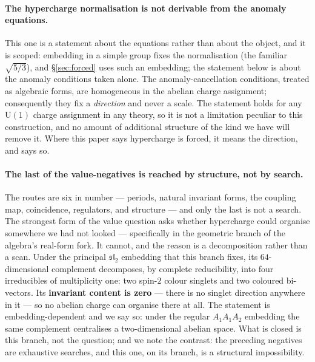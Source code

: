 \documentclass[11pt,a4paper]{article}
\theoremstyle{definition}
\theoremstyle{remark}
\begin{document}
\paragraph{The hypercharge normalisation is not derivable from the anomaly equations.} This one is a statement about
the equations rather than about the object, and it is scoped: embedding in a simple group fixes the normalisation (the
familiar $\sqrt{5/3}$), and \S\ref{sec:forced} uses such an embedding; the statement below is about the anomaly
conditions taken alone. The anomaly-cancellation conditions, treated as algebraic
forms, are homogeneous in the abelian charge assignment; consequently they fix a \emph{direction} and
never a scale. The statement holds for any $\mathrm{U}(1)$ charge assignment in any theory, so it is
not a limitation peculiar to this construction, and no amount of additional structure of the kind we
have will remove it. Where this paper says hypercharge is forced, it means the direction, and says so.

\paragraph{The last of the value-negatives is reached by structure, not by search.} The routes
are six in number --- periods, natural invariant forms, the coupling map, coincidence, regulators,
and structure --- and only the last is not a search. The strongest form of the
value question asks whether hypercharge could organise somewhere we had not looked --- specifically
in the geometric branch of the algebra's real-form fork. It cannot, and the reason is a decomposition
rather than a scan. Under the principal $\mathfrak{sl}_2$ embedding that this branch fixes, its $64$-dimensional complement decomposes, by
complete reducibility, into four irreducibles of multiplicity one: two spin-$2$ colour singlets and two coloured
bi-vectors. Its \textbf{invariant content is zero} --- there is no singlet direction anywhere in it
--- so no abelian charge can organise there at all. The statement is embedding-dependent and we say so: under the regular
$A_1 A_1 A_2$ embedding the same complement centralises a two-dimensional abelian space. What is closed is this branch, not
the question; and we note the contrast: the preceding negatives are exhaustive searches, and this one, on its branch, is a
structural impossibility.
\end{document}
